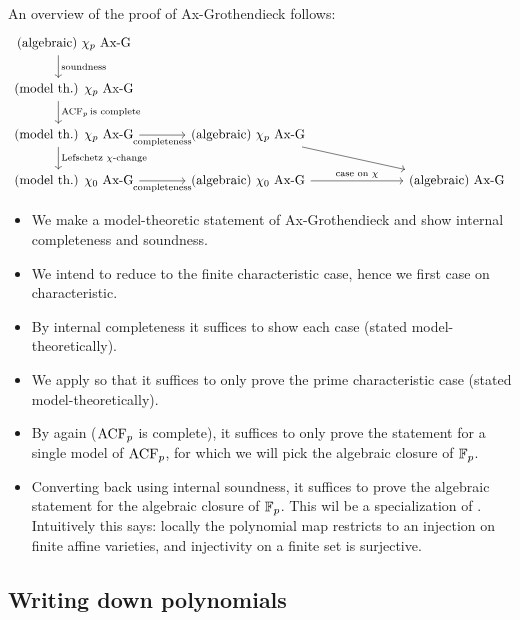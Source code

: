 An overview of the proof of Ax-Grothendieck follows:
\[\begin{tikzcd}[column sep=large]
	{\text{(algebraic) $\chi_{p}$ Ax-G}} \\
	{\text{(model th.) $\chi_{p}$ Ax-G}} \\
	{\text{(model th.) }\chi_p \text{ Ax-G}} & {\text{(algebraic) }\chi_p \text{ Ax-G}} \\
	{\text{(model th.) }\chi_0 \text{ Ax-G}} & {\text{(algebraic) }\chi_0 \text{ Ax-G}} && {\text{(algebraic) Ax-G}}
	\arrow["{\ACF_{p} \text{is complete}}", shift right=5, from=2-1, to=3-1]
	\arrow["{\text{Lefschetz }\chi\text{-change}}", shift right=5, from=3-1, to=4-1]
  \arrow["{\text{soundness}}", shift right=5, from=1-1, to=2-1]
  \arrow["{\text{completeness}}"', from=3-1, to=3-2]
	\arrow["{\text{completeness}}"', from=4-1, to=4-2]
	\arrow[from=3-2, to=4-4]
	\arrow["{\text{case on }\chi}", from=4-2, to=4-4]
\end{tikzcd}\]

\begin{itemize}
  \item We make a model-theoretic statement of Ax-Grothendieck
        and show internal completeness and soundness.
  \item We intend to reduce to the finite characteristic case,
        hence we first case on characteristic.
  \item By internal completeness it suffices to show
        each case (stated model-theoretically).
  \item We apply 
        so that it suffices to only prove the prime characteristic case
        (stated model-theoretically).
  \item By  again ($\operatorname{ACF}_{p}$ is complete),
        it suffices to only prove the statement for a single model of $\operatorname{ACF}_{p}$,
        for which we will pick the algebraic closure of $\mathbb{F}_{p}$.
  \item Converting back using internal soundness, it suffices to prove
        the algebraic statement for the algebraic closure of $\mathbb{F}_{p}$.
        This wil be a specialization of
        .
        Intuitively this says: locally the polynomial map restricts to an injection
        on finite affine varieties, and injectivity on a finite set is surjective.
\end{itemize}

\subsection{Writing down polynomials}

